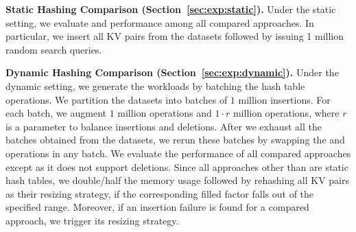 \vspace{1mm}\noindent\textbf{Static Hashing Comparison (Section~\ref{sec:exp:static}).}
Under the static setting, we evaluate  and  performance among all compared approaches. 
In particular, we insert all KV pairs from the datasets followed by issuing 1 million random search queries. 

\vspace{1mm}\noindent\textbf{Dynamic Hashing Comparison (Section~\ref{sec:exp:dynamic}).}
Under the dynamic setting, we generate the workloads by batching the hash table operations. 
We partition the datasets into batches of $1$ million insertions. 
For each batch, we augment $1$ million  operations and $1 \cdot r$ million  operations,
where $r$ is a parameter to balance insertions and deletions.
After we exhaust all the batches obtained from the datasets, we rerun these batches by swapping the  and  operations in any batch. 
We evaluate the performance of all compared approaches except \cudpp as it does not support deletions. 
Since all approaches other than \voter are static hash tables, we double/half the memory usage followed by rehashing all KV pairs as their resizing strategy, if the corresponding filled factor falls out of the specified range. 
Moreover, if an insertion failure is found for a compared approach, we trigger its resizing strategy.

